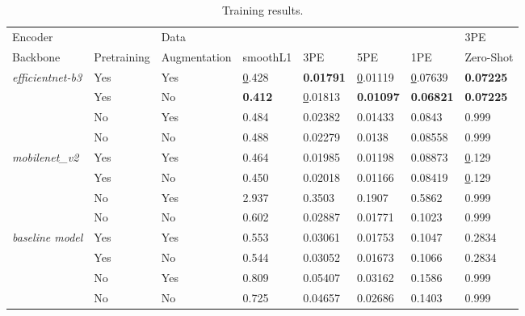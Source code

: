 \documentclass[runningheads]{llncs}
\begin{document}
\begin{table}[h]
\centering
\begin{tabular}{|l|l|l||l|l|l|l|l|}
\hline
Encoder                 &             & Data         &                &                  &                 &                  & 3PE         \\
Backbone                & Pretraining & Augmentation & smoothL1       & 3PE              & 5PE             & 1PE              &  Zero-Shot \\ \hline\hline
\textit{efficientnet-b3}               & Yes         & Yes               & {\ul 0.428}    & \textbf{0.01791} & {\ul 0.01119}   & {\ul 0.07639}    & \textbf{0.07225}\\
                                       & Yes         & No                & \textbf{0.412} & {\ul 0.01813}    & \textbf{0.01097}& \textbf{0.06821} & \textbf{0.07225}\\
                                       & No          & Yes               & 0.484          & 0.02382          & 0.01433         & 0.0843           & 0.999         \\
                                       & No          & No                & 0.488          & 0.02279          & 0.0138          & 0.08558          & 0.999         \\ \hline
\textit{mobilenet\_v2}                 & Yes         & Yes               & 0.464          & 0.01985          & 0.01198         & 0.08873          & {\ul 0.129}   \\
                                       & Yes         & No                & 0.450          & 0.02018          & 0.01166         & 0.08419          & {\ul 0.129}   \\
                                       & No          & Yes               & 2.937          & 0.3503           & 0.1907          & 0.5862           & 0.999         \\
                                       & No          & No                & 0.602          & 0.02887          & 0.01771         & 0.1023           & 0.999         \\ \hline
\textit{baseline model}                & Yes         & Yes               & 0.553          & 0.03061          & 0.01753         & 0.1047           & 0.2834        \\
                                       & Yes         & No                & 0.544          & 0.03052          & 0.01673         & 0.1066           & 0.2834        \\
                                       & No          & Yes               & 0.809          & 0.05407          & 0.03162         & 0.1586           & 0.999         \\
                                       & No          & No                & 0.725          & 0.04657          & 0.02686         & 0.1403           & 0.999         \\ \hline
\end{tabular}
\caption{Training results.\label{Tab:Training}}
\vspace{-10pt}
\end{table}
\end{document}

